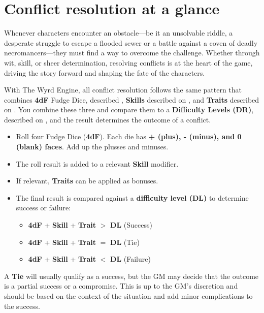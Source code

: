 \section{Conflict resolution at a glance}

Whenever characters encounter an obstacle—be it an unsolvable riddle, a desperate struggle to escape a flooded sewer or a battle against a coven of deadly necromancers—they must find a way to overcome the challenge. Whether through wit, skill, or sheer determination, resolving conflicts is at the heart of the game, driving the story forward and shaping the fate of the characters.

With The Wyrd Engine, all conflict resolution follows the same pattern that combines \textbf{4dF} Fudge Dice, described , \textbf{Skills} described on , and \textbf{Traits} described on . You combine these three and compare them to a \textbf{Difficulty Levels (DR)}, described on , and the result determines the outcome of a conflict.

\begin{WyrdExplanation}
	\begin{itemize}
		\item Roll four Fudge Dice (\textbf{4dF}).
		      Each die has \textbf{+ (plus), - (minus), and 0 (blank) faces}. Add up the plusses and minuses.
		\item The roll result is added to a relevant \textbf{Skill} modifier.
		\item If relevant, \textbf{Traits} can be applied as bonuses.
		\item The final result is compared against a \textbf{difficulty level (DL)} to determine success or failure:
		\begin{itemize}
			\item \textbf{4dF} + \textbf{Skill} + \textbf{Trait} $>$ \textbf{DL} (Success)	
			\item \textbf{4dF} + \textbf{Skill} + \textbf{Trait} $=$ \textbf{DL} (Tie)
			\item \textbf{4dF} + \textbf{Skill} + \textbf{Trait} $<$ \textbf{DL} (Failure)
		\end{itemize}
	\end{itemize}
\end{WyrdExplanation}

A \textbf{Tie} will usually qualify as a success, but the GM may decide that the outcome is a partial success or a compromise. This is up to the GM's discretion and should be based on the context of the situation and add minor complications to the success.

